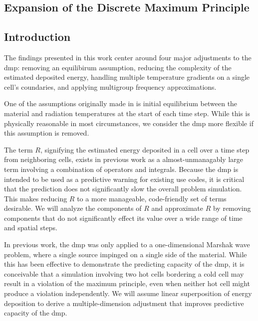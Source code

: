 
\begin{center}
\section{Expansion of the Discrete Maximum Principle}
\end{center}

\aboveSubSecSkip
\subsection{Introduction}
\noindent
	\indent 
The findings presented in this work center around four major adjustments to the \gls{dmp}: removing an equilibirum assumption, reducing the complexity of the estimated deposited energy, handling multiple temperature gradients on a single cell's coundaries, and applying multigroup frequency approximations.

One of the assumptions originally made in \cite{WolLarDen} is initial equilibrium between the material and radiation temperatures at the start of each time step.  While this is physically reasonable in most circumstances, we consider the \gls{dmp} more flexible if this assumption is removed.

The term $R$, signifying the estimated energy deposited in a cell over a time step from neighboring cells, exists in previous work as a almost-unmanagably large term involving a combination of operators and integrals.  Because the \gls{dmp} is intended to be used as a predictive warning for existing use codes, it is critical that the prediction does not significantly slow the overall problem simulation.  This makes reducing $R$ to a more manageable, code-friendly set of terms desirable.  We will analyze the components of $R$ and approximate $R$ by removing components that do not significantly effect its value over a wide range of time and spatial steps.

In previous work, the \gls{dmp} was only applied to a one-dimensional Marshak wave problem, where a single source impinged on a single side of the material.  While this has been effective to demonstrate the predicting capacity of the \gls{dmp}, it is conceivable that a simulation involving two hot cells bordering a cold cell may result in a violation of the maximum principle, even when neither hot cell might produce a violation independently.  We will assume linear superposition of energy deposition to derive a multiple-dimension adjustment that improves predictive capacity of the \gls{dmp}.


